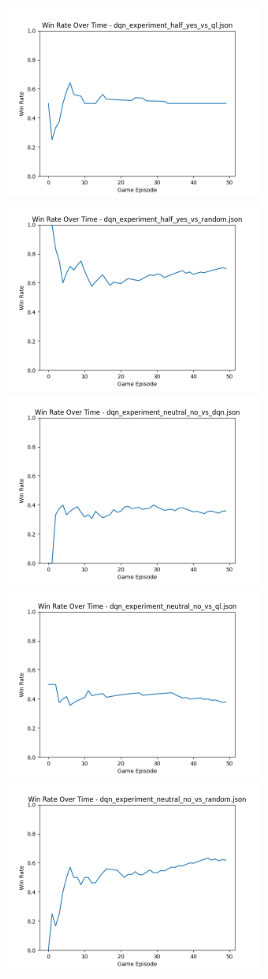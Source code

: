 \includegraphics[width=0.5\textwidth]{images/win_rate_dqn_experiment_half_yes_vs_ql.png} 
\includegraphics[width=0.5\textwidth]{images/win_rate_dqn_experiment_half_yes_vs_random.png} 
\includegraphics[width=0.5\textwidth]{images/win_rate_dqn_experiment_neutral_no_vs_dqn.png} 
\includegraphics[width=0.5\textwidth]{images/win_rate_dqn_experiment_neutral_no_vs_ql.png} 
\includegraphics[width=0.5\textwidth]{images/win_rate_dqn_experiment_neutral_no_vs_random.png} 
